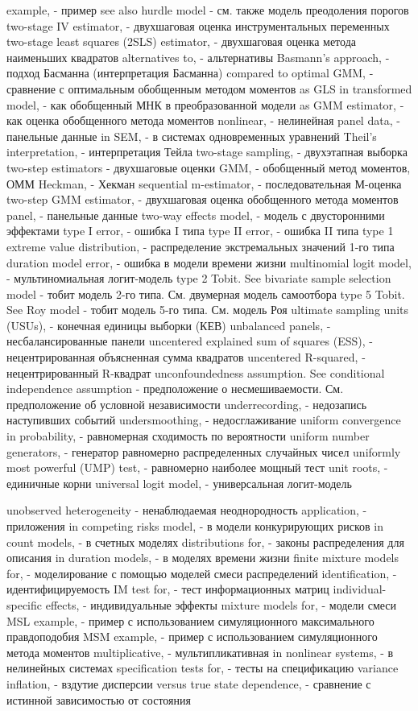 example, - пример
see also hurdle model - см. также модель преодоления порогов
two-stage IV estimator, - двухшаговая оценка инструментальных переменных
two-stage least squares (2SLS) estimator, - двухшаговая оценка метода наименьших квадратов
alternatives to, - альтернативы
Basmann’s approach, - подход Басманна (интерпретация Басманна)
compared to optimal GMM, - сравнение с оптимальным обобщенным методом моментов
as GLS in transformed model, - как обобщенный МНК в преобразованной модели
as GMM estimator, - как оценка обобщенного метода моментов
nonlinear, - нелинейная
panel data, - панельные данные
in SEM, - в системах одновременных уравнений
Theil’s interpretation, - интерпретация Тейла
two-stage sampling, - двухэтапная выборка
two-step estimators - двухшаговые оценки
GMM, - обобщенный метод моментов, ОММ
Heckman, - Хекман
sequential m-estimator, - последовательная М-оценка
two-step GMM estimator, - двухшаговая оценка обобщенного метода моментов
panel, - панельные данные
two-way effects model, - модель с двусторонними эффектами
type I error, - ошибка I типа
type II error, - ошибка II типа
type 1 extreme value distribution, - распределение экстремальных значений 1-го типа
duration model error, - ошибка в модели времени жизни
multinomial logit model, - мультиномиальная логит-модель
type 2 Tobit. See bivariate sample selection model - тобит модель 2-го типа. См. двумерная модель самоотбора
type 5 Tobit. See Roy model - тобит модель 5-го типа. См. модель Роя
ultimate sampling units (USUs), - конечная единицы выборки (КЕВ)
unbalanced panels, - несбалансированные панели
uncentered explained sum of squares (ESS), - нецентрированная объясненная сумма квадратов
uncentered R-squared, - нецентрированный R-квадрат
unconfoundedness assumption. See conditional independence assumption - предположение о несмешиваемости. См. предположение об условной независимости
underrecording, - недозапись наступивших событий
undersmoothing, - недосглаживание
uniform convergence in probability, - равномерная сходимость по вероятности
uniform number generators, - генератор равномерно распределенных случайных чисел
uniformly most powerful (UMP) test, - равномерно наиболее мощный тест
unit roots, - единичные корни
universal logit model, - универсальная логит-модель

unobserved heterogeneity - ненаблюдаемая неоднородность
application, - приложения
in competing risks model, - в модели конкурирующих рисков
in count models, - в счетных моделях
distributions for, - законы распределения для описания
in duration models, - в моделях времени жизни
finite mixture models for, - моделирование с помощью моделей смеси распределений
identification, - идентифицируемость
IM test for, - тест информационных матриц
individual-specific effects, - индивидуальные эффекты
mixture models for, - модели смеси
MSL example, - пример с использованием симуляционного максимального правдоподобия
MSM example, - пример с использованием симуляционного метода моментов
multiplicative, - мультипликативная
in nonlinear systems, - в нелинейных системах
specification tests for, - тесты на спецификацию
variance inflation, - вздутие дисперсии
versus true state dependence, - сравнение с истинной зависимостью от состояния

